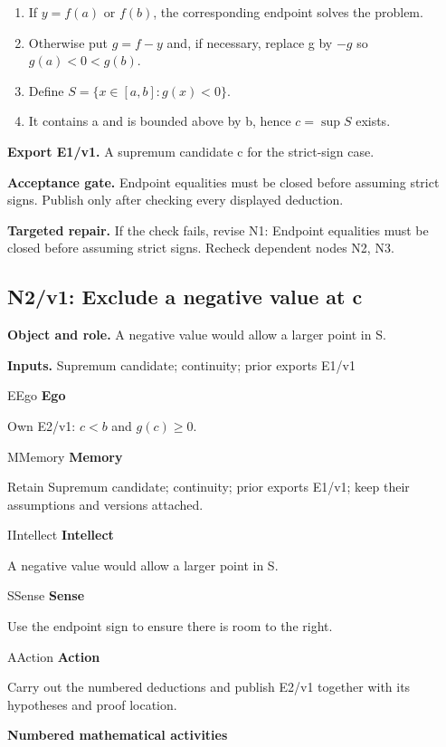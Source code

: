 \documentclass[preprint,12pt,aps,pra,showkeys,amsmath,amssymb,superscriptaddress,floatfix]{revtex4-2}
\theoremstyle{definition}
\theoremstyle{remark}
\newcommand{\mmfaculty}[3]{%
 \begin{mmfacultybox}{#1}{#2}
 {\sffamily\bfseries\color{MMBlue}#2}\par\smallskip #3
 \end{mmfacultybox}}
\newcommand{\field}[2]{\par\smallskip\noindent\textbf{#1.} #2\par}
\begin{document}
\begin{enumerate}[label=N1.\arabic*,leftmargin=3.4em]

\item If \(y=f(a)\) or \(f(b)\), the corresponding endpoint solves the
problem.

\item Otherwise put \(g=f-y\) and, if necessary, replace g by \(-g\) so
\(g(a)<0<g(b)\).

\item Define \(S=\{x\in [a,b]:g(x)<0\}\).

\item It contains a and is bounded above by b, hence
\(c=\operatorname{sup} S\) exists.

\end{enumerate}

\field{Export E1/v1}{A supremum candidate c for the strict-sign case.}

\field{Acceptance gate}{Endpoint equalities must be closed before assuming strict signs. Publish
only after checking every displayed deduction.}

\field{Targeted repair}{If the check fails, revise N1: Endpoint equalities must be closed before
assuming strict signs. Recheck dependent nodes N2, N3.}

\clearpage

\subsection{N2/v1: Exclude a negative value at c}

\field{Object and role}{A negative value would allow a larger point in S.}

\field{Inputs}{Supremum candidate; continuity; prior exports E1/v1}

\mmfaculty{E}{Ego}{Own E2/v1: \(c<b\) and \(g(c)\ge 0\).}

\mmfaculty{M}{Memory}{Retain Supremum candidate; continuity; prior exports E1/v1; keep their
assumptions and versions attached.}

\mmfaculty{I}{Intellect}{A negative value would allow a larger point in S.}

\mmfaculty{S}{Sense}{Use the endpoint sign to ensure there is room to the right.}

\mmfaculty{A}{Action}{Carry out the numbered deductions and publish E2/v1 together with its
hypotheses and proof location.}

\smallskip\noindent\textbf{Numbered mathematical activities}
\end{document}

